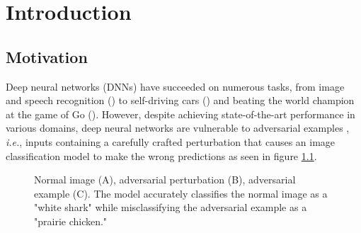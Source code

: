 \chapter{Introduction}
\label{Introduction}

\section{Motivation}

\overridetextsize
Deep neural networks (DNNs) have succeeded on numerous tasks, from image and
speech recognition (\cite{russakovsky_imagenet_2015,amodei_deep_2015}) to
self-driving cars (\cite{bojarski_end_2016}) and beating the world champion at
the game of Go (\cite{silver_mastering_2016}). However, despite achieving
state-of-the-art performance in various domains, deep neural networks are
vulnerable to adversarial examples \cite{szegedy_intriguing_2014}, \emph{i.e.},
inputs containing a carefully crafted perturbation that causes an image
classification model to make the wrong predictions as seen in figure
\ref{fig:adversarial_examples}.

\begin{figure}[!htb]
    \centering
    \caption{Normal image (A), adversarial perturbation (B), adversarial
        example (C). The model accurately classifies the normal image as a
        "white shark" while misclassifying the adversarial example as a "prairie
        chicken."}
    \label{fig:adversarial_examples}
\end{figure}

